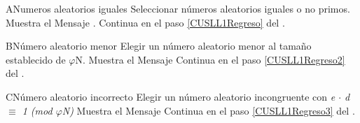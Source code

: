 
		
\begin{UCtrayectoriaA}{A}{Numeros aleatorios iguales}
	\UCpaso Seleccionar números aleatorios iguales o no primos.
	\UCpaso Muestra el Mensaje .
	\UCpaso Continua en el paso \ref{CUSLL1Regreso} del .
\end{UCtrayectoriaA}

\begin{UCtrayectoriaA}{B}{Número aleatorio menor}
	\UCpaso Elegir un número aleatorio menor al tamaño establecido de $\varphi${N}.
	\UCpaso Muestra el Mensaje 
	\UCpaso Continua en el paso \ref{CUSLL1Regreso2} del .
\end{UCtrayectoriaA}

\begin{UCtrayectoriaA}{C}{Número aleatorio incorrecto}
	\UCpaso Elegir un número aleatorio incongruente con \textit{e $\cdot$ d $\equiv$ 1 (mod $\varphi${N})} 
	\UCpaso Muestra el Mensaje 
	\UCpaso Continua en el paso \ref{CUSLL1Regreso3} del .
\end{UCtrayectoriaA}

